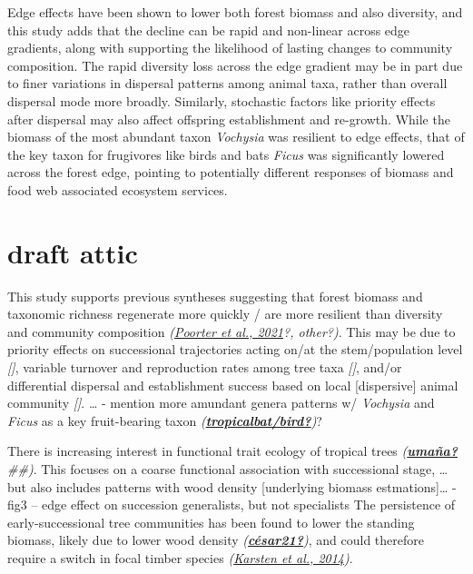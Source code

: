 \documentclass[
  12pt,
]{article}
\begin{document}
Edge effects have been shown to lower both forest biomass and also diversity, and this study adds that the decline can be rapid and non-linear across edge gradients, along with supporting the likelihood of lasting changes to community composition.
The rapid diversity loss across the edge gradient may be in part due to finer variations in dispersal patterns among animal taxa, rather than overall dispersal mode more broadly.
Similarly, stochastic factors like priority effects after dispersal may also affect offspring establishment and re-growth.
While the biomass of the most abundant taxon \emph{Vochysia} was resilient to edge effects, that of the key taxon for frugivores like birds and bats \emph{Ficus} was significantly lowered across the forest edge, pointing to potentially different responses of biomass and food web associated ecosystem services.

\hypertarget{draft-attic}{%
\section*{draft attic}\label{draft-attic}}

This study supports previous syntheses suggesting that forest biomass and taxonomic richness regenerate more quickly / are more resilient than diversity and community composition \emph{(\protect\hyperlink{ref-poorter21}{Poorter et al., 2021}?, other?)}.
This may be due to priority effects on successional trajectories acting on/at the stem/population level \emph{{[}{]}}, variable turnover and reproduction rates among tree taxa \emph{{[}{]}}, and/or differential dispersal and establishment success based on local {[}dispersive{]} animal community \emph{{[}{]}}. \ldots{}
- mention more amundant genera patterns w/ \emph{Vochysia} and \emph{Ficus} as a key fruit-bearing taxon \emph{(\protect\hyperlink{ref-tropicalbatux2fbird}{\textbf{tropicalbat/bird?}})}?

There is increasing interest in functional trait ecology of tropical trees \emph{(\protect\hyperlink{ref-umauxf1a}{\textbf{umaña?}}\#\#)}.
This focuses on a coarse functional association with successional stage, \ldots{}
but also includes patterns with wood density {[}underlying biomass estmations{]}\ldots{}
- fig3 -- edge effect on succession generalists, but not specialists
The persistence of early-successional tree communities has been found to lower the standing biomass, likely due to lower wood density \emph{(\protect\hyperlink{ref-cuxe9sar21}{\textbf{césar21?}})}, and could therefore require a switch in focal timber species \emph{(\protect\hyperlink{ref-karsten14}{Karsten et al., 2014})}.
\end{document}
